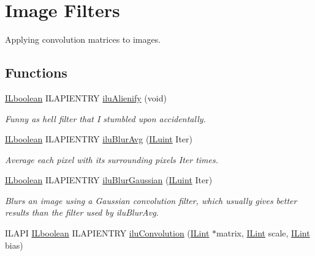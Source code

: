 \hypertarget{group__ilu__filter}{\section{Image Filters}
\label{group__ilu__filter}
}


Applying convolution matrices to images.  


\subsection*{Functions}
\begin{DoxyCompactItemize}
\item 
\hyperlink{group__il__types_gaa6aa7c95cfdc06b4d8601ef832b7bb0a}{I\+Lboolean} I\+L\+A\+P\+I\+E\+N\+T\+R\+Y \hyperlink{group__ilu__filter_gacb6e1a0e8dc10748f1cfbf60b1f8c350}{ilu\+Alienify} (void)
\begin{DoxyCompactList}\small\item\em Funny as hell filter that I stumbled upon accidentally. \end{DoxyCompactList}\item 
\hyperlink{group__il__types_gaa6aa7c95cfdc06b4d8601ef832b7bb0a}{I\+Lboolean} I\+L\+A\+P\+I\+E\+N\+T\+R\+Y \hyperlink{group__ilu__filter_ga017478330f243e5bb6e6edc29cdf1f37}{ilu\+Blur\+Avg} (\hyperlink{group__il__types_gaff8e86a1072c8d7cfe387fb87c6ed8e1}{I\+Luint} Iter)
\begin{DoxyCompactList}\small\item\em Average each pixel with its surrounding pixels {\itshape Iter} times. \end{DoxyCompactList}\item 
\hyperlink{group__il__types_gaa6aa7c95cfdc06b4d8601ef832b7bb0a}{I\+Lboolean} I\+L\+A\+P\+I\+E\+N\+T\+R\+Y \hyperlink{group__ilu__filter_ga4163c484488b3afc352e3ed6c768babf}{ilu\+Blur\+Gaussian} (\hyperlink{group__il__types_gaff8e86a1072c8d7cfe387fb87c6ed8e1}{I\+Luint} Iter)
\begin{DoxyCompactList}\small\item\em Blurs an image using a Gaussian convolution filter, which usually gives better results than the filter used by ilu\+Blur\+Avg. \end{DoxyCompactList}\item 
I\+L\+A\+P\+I \hyperlink{group__il__types_gaa6aa7c95cfdc06b4d8601ef832b7bb0a}{I\+Lboolean} I\+L\+A\+P\+I\+E\+N\+T\+R\+Y \hyperlink{group__ilu__filter_gaeb5bb85ceb172bd9742f7f0730a1d440}{ilu\+Convolution} (\hyperlink{group__il__types_ga8effe51a00daaa0878631e5af75a36cb}{I\+Lint} $\ast$matrix, \hyperlink{group__il__types_ga8effe51a00daaa0878631e5af75a36cb}{I\+Lint} scale, \hyperlink{group__il__types_ga8effe51a00daaa0878631e5af75a36cb}{I\+Lint} bias)

\end{DoxyCompactItemize}
